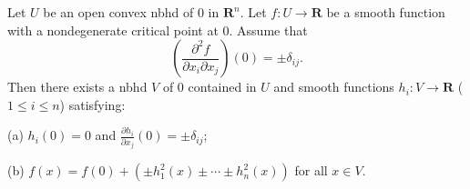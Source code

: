 Let $U$ be an open convex nbhd of $0$ in $\mathbf{R}^n$. Let $f: U \to \mathbf{R}$ be a smooth function with a nondegenerate critical point at $0$. Assume that
$$\left(\frac{\partial^2 f}{\partial x_i \partial x_j}\right)(0) = \pm \delta_{ij}.$$
Then there exists a nbhd $V$ of $0$ contained in $U$ and smooth functions $h_i: V \to \mathbf{R}$ ($1 \leq i \leq n$) satisfying:

(a) $h_i(0) = 0$ and $\displaystyle\frac{\partial h_i}{\partial x_j}(0) = \pm \delta_{ij}$;

(b) $f(x) = f(0) + (\pm h_1^2(x) \pm \cdots \pm h_n^2(x))$ for all $x \in V$.
